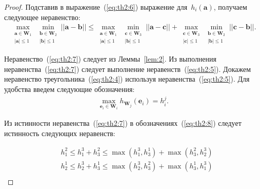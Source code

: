 \begin{proof}
Подставив в выражение~(\ref{eq:th2:6}) выражение для~$h_i\left(\textbf{a}\right)$, получаем следующее неравенство:
\begin{equation}
\label{eq:th2:7}
\begin{aligned}
\max_{\substack{\textbf{a} \in \textbf{W}_1 \\ \left|\textbf{a}\right| \leq 1}} \min_{\substack{\textbf{b} \in \textbf{W}_2 \\ \left|\textbf{b}\right| \leq 1}}||\textbf{a} - \textbf{b}|| \leq 
\max_{\substack{\textbf{a} \in \textbf{W}_1 \\ \left|\textbf{a}\right| \leq 1}} \min_{\substack{\textbf{c} \in \textbf{W}_3 \\ \left|\textbf{b}\right| \leq 1}}||\textbf{a} - \textbf{c}||+
\max_{\substack{\textbf{c} \in \textbf{W}_3 \\ \left|\textbf{c}\right| \leq 1}} \min_{\substack{\textbf{b} \in \textbf{W}_2 \\ \left|\textbf{b}\right| \leq 1}}||\textbf{c} - \textbf{b}||.
\end{aligned}
\end{equation}

Неравенство~(\ref{eq:th2:7}) следует из Леммы~\ref{lem:2}. Из выполнения неравенства~(\ref{eq:th2:7}) следует выполнение неравенств~(\ref{eq:th2:5}).
Докажем неравенство треугольника~(\ref{eq:th2:4}) используя неравенства~(\ref{eq:th2:5}). Для удобства введем следующие обозначения:
\begin{equation}
\label{eq:th2:8}
\begin{aligned}
\max_{\textbf{e}_i \in \textbf{W}_i} h_{\textbf{W}_j}\left(\textbf{e}_i\right) = h_{i}^{j}.
\end{aligned}
\end{equation}

Из истинности неравенства~(\ref{eq:th2:7}) в обозначениях~(\ref{eq:th2:8}) следует истинность следующих неравенств:
 
\begin{equation}
\label{eq:th2:9}
\begin{aligned}
\quad h_{1}^{2} \leq h_{1}^{3} + h_{3}^{2} \leq \max\left(h_{1}^{3}, h_{3}^{1}\right) + \max\left(h_{3}^{2}, h_{2}^{3}\right)\\
\quad h_{2}^{1} \leq h_{2}^{3} + h_{3}^{1} \leq \max\left(h_{2}^{3}, h_{3}^{2}\right) + \max\left(h_{3}^{1}, h_{1}^{3}\right)\\
\end{aligned}
\end{equation}


\end{proof}
